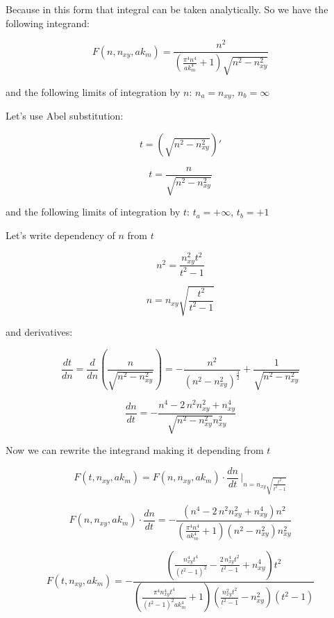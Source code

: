 \documentclass[11pt]{article}
\begin{document}
    Because in this form that integral can be taken analytically. So we have
the following integrand:

    \[F\left(n, n_{xy}, ak_m\right) = \frac{n^{2}}{{\left(\frac{\pi^{4} n^{4}}{\mathit{ak}_{m}^{4}} + 1\right)} \sqrt{n^{2} - n_{\mathit{xy}}^{2}}}\]

    and the following limits of integration by \(n\): \(n_a = n_{xy}\),
\(n_b = \infty\)

    Let's use Abel substitution:

\[t = \left(\sqrt{n^2-n_{xy}^2}\right)'\]

    \[t = \frac{n}{\sqrt{n^{2} - n_{\mathit{xy}}^{2}}}\]

    and the following limits of integration by \(t\): \(t_a = +\infty\),
\(t_b = +1\)

    Let's write dependency of \(n\) from \(t\)

    \[n^{2} = \frac{n_{\mathit{xy}}^{2} t^{2}}{t^{2} - 1}\]

    \[n = n_{\mathit{xy}} \sqrt{\frac{t^{2}}{t^{2} - 1}}\]

    and derivatives:

    \[\frac{dt}{dn} = \frac{d}{dn} \left( \frac{n}{\sqrt{n^{2} - n_{\mathit{xy}}^{2}}} \right)= -\frac{n^{2}}{{\left(n^{2} - n_{\mathit{xy}}^{2}\right)}^{\frac{3}{2}}} + \frac{1}{\sqrt{n^{2} - n_{\mathit{xy}}^{2}}}\]

    \[\frac{dn}{dt} = -\frac{n^{4} - 2 \, n^{2} n_{\mathit{xy}}^{2} + n_{\mathit{xy}}^{4}}{\sqrt{n^{2} - n_{\mathit{xy}}^{2}} n_{\mathit{xy}}^{2}}\]

    Now we can rewrite the integrand making it depending from \(t\)

    \[F\left(t, n_{xy}, ak_m\right) = F\left(n, n_{xy}, ak_m\right) \cdot \frac{dn}{dt} \, \Bigg\rvert_{ n = n_{\mathit{xy}} \sqrt{\frac{t^{2}}{t^{2} - 1}} }\]

\[F\left(n, n_{xy}, ak_m\right) \cdot \frac{dn}{dt} = -\frac{{\left(n^{4} - 2 \, n^{2} n_{\mathit{xy}}^{2} + n_{\mathit{xy}}^{4}\right)} n^{2}}{{\left(\frac{\pi^{4} n^{4}}{\mathit{ak}_{m}^{4}} + 1\right)} {\left(n^{2} - n_{\mathit{xy}}^{2}\right)} n_{\mathit{xy}}^{2}}\]

\[F\left(t, n_{xy}, ak_m\right) = -\frac{{\left(\frac{n_{\mathit{xy}}^{4} t^{4}}{{\left(t^{2} - 1\right)}^{2}} - \frac{2 \, n_{\mathit{xy}}^{4} t^{2}}{t^{2} - 1} + n_{\mathit{xy}}^{4}\right)} t^{2}}{{\left(\frac{\pi^{4} n_{\mathit{xy}}^{4} t^{4}}{{\left(t^{2} - 1\right)}^{2} \mathit{ak}_{m}^{4}} + 1\right)} {\left(\frac{n_{\mathit{xy}}^{2} t^{2}}{t^{2} - 1} - n_{\mathit{xy}}^{2}\right)} {\left(t^{2} - 1\right)}}\]
\end{document}
